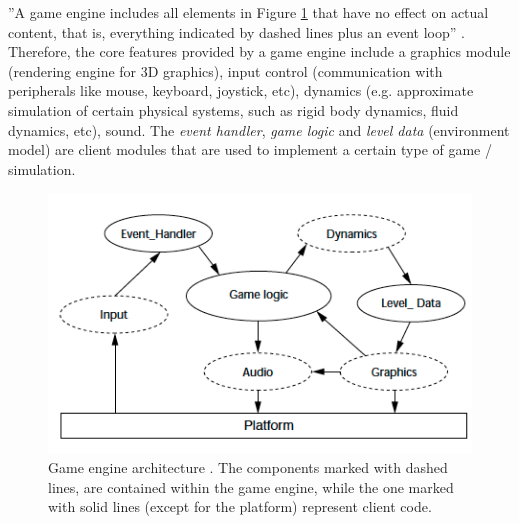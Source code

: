 ''A game engine includes all elements in Figure \ref{fig:game_engine_architecture} that have no effect on actual content, that is, everything indicated by dashed lines plus an event loop'' \cite{shantz1998designing}. Therefore, the core features provided by a game engine include a graphics module (rendering engine for 3D graphics), input control (communication with peripherals like mouse, keyboard, joystick, etc), dynamics (e.g. approximate simulation of certain physical systems, such as rigid body dynamics, fluid dynamics, etc), sound. The \emph{event handler}, \emph{game logic} and \emph{level data} (environment model) are client modules that are used to implement a certain type of game / simulation.\\
\begin{figure}[H]
	\centering
	\includegraphics[width=\linewidth]{gfx/Chapter3/game_engine_architecture}
	\caption{Game engine architecture \cite{shantz1998designing}. The components marked with dashed lines, are contained within the game engine, while the one marked with solid lines (except for the platform) represent client code.}
	\label{fig:game_engine_architecture}
\end{figure}


